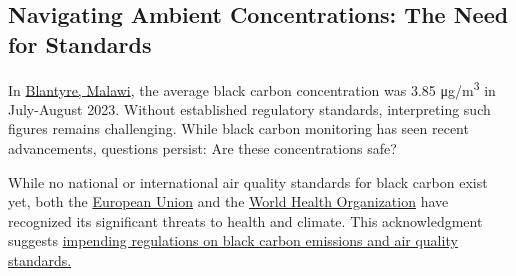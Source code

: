 \documentclass[
  letterpaper,
  DIV=11,
  numbers=noendperiod]{scrartcl}
\begin{document}
\subsection{Navigating Ambient Concentrations: The Need for
Standards}\label{navigating-ambient-concentrations-the-need-for-standards}

In \href{https://visitmalawi.mw/index.php/blantyre-city/}{Blantyre,
Malawi}, the average black carbon concentration was 3.85
μg/m\textsuperscript{3} in July-August 2023. Without established
regulatory standards, interpreting such figures remains challenging.
While black carbon monitoring has seen recent advancements, questions
persist: Are these concentrations safe?

While no national or international air quality standards for black
carbon exist yet, both the
\href{https://fpi.ec.europa.eu/news/eu-action-sheds-light-black-carbon-emissions-2019-08-27_en}{European
Union} and the
\href{https://iris.who.int/bitstream/handle/10665/352615/9789289002653-eng.pdf?sequence=1}{World
Health Organization} have recognized its significant threats to health
and climate. This acknowledgment suggests
\href{https://en.ilmatieteenlaitos.fi/tiedote/5ePGJSjeZo1t5qvIjQO992}{impending
regulations on black carbon emissions and air quality standards.}
\end{document}
